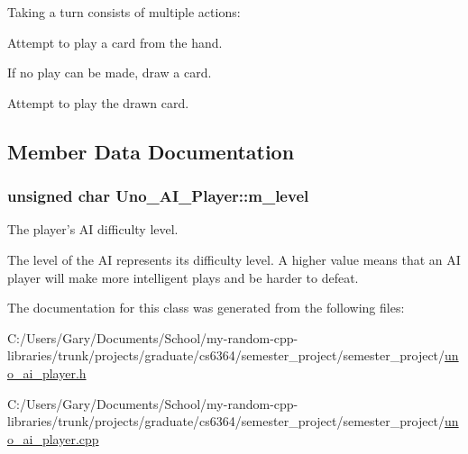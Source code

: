 \-Taking a turn consists of multiple actions\-: \begin{DoxyItemize}
\item \-Attempt to play a card from the hand. \item \-If no play can be made, draw a card. \item \-Attempt to play the drawn card. \end{DoxyItemize}


\subsection{\-Member \-Data \-Documentation}
\hypertarget{class_uno___a_i___player_a028b0df8cca96eb10fc87bebf0f48c25}{
\subsubsection[{m\-\_\-level}]{\setlength{\rightskip}{0pt plus 5cm}unsigned char {\bf \-Uno\-\_\-\-A\-I\-\_\-\-Player\-::m\-\_\-level}}}
\label{class_uno___a_i___player_a028b0df8cca96eb10fc87bebf0f48c25}


\-The player's \-A\-I difficulty level. 

\-The level of the \-A\-I represents its difficulty level. \-A higher value means that an \-A\-I player will make more intelligent plays and be harder to defeat. 

\-The documentation for this class was generated from the following files\-:\begin{DoxyCompactItemize}
\item 
\-C\-:/\-Users/\-Gary/\-Documents/\-School/my-\/random-\/cpp-\/libraries/trunk/projects/graduate/cs6364/semester\-\_\-project/semester\-\_\-project/\hyperlink{uno__ai__player_8h}{uno\-\_\-ai\-\_\-player.\-h}\item 
\-C\-:/\-Users/\-Gary/\-Documents/\-School/my-\/random-\/cpp-\/libraries/trunk/projects/graduate/cs6364/semester\-\_\-project/semester\-\_\-project/\hyperlink{uno__ai__player_8cpp}{uno\-\_\-ai\-\_\-player.\-cpp}\end{DoxyCompactItemize}
